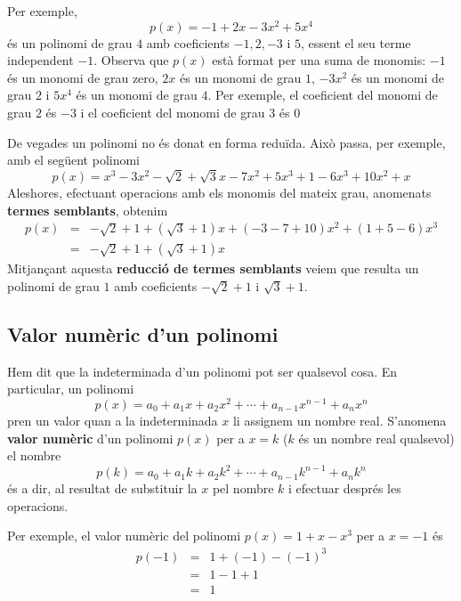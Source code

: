 Per exemple,\begin{equation*}
p(x)=-1+2x-3x^{2}+5x^{4}
\end{equation*}és un polinomi de grau $4$ amb coeficients $-1,2,-3$ i $5$, essent el seu terme independent $-1$. Observa que $p(x)$ està format per una
suma de monomis: $-1$ és un monomi de grau zero, $2x$ és un monomi de
grau $1$, $-3x^{2}$ és un monomi de grau $2$ i $5x^{4}$ és un monomi de
grau $4$. Per exemple, el coeficient del monomi de grau $2$ és $-3$ i el coeficient
del monomi de grau $3$ és $0$

De vegades un polinomi no és donat en forma reduïda. Això passa, per
exemple, amb el següent polinomi\begin{equation*}
p(x)=x^{3}-3x^{2}-\sqrt{2}+\sqrt{3}x-7x^{2}+5x^{3}+1-6x^{3}+10x^{2}+x
\end{equation*}Aleshores, efectuant operacions amb els monomis del mateix grau,
anomenats \textbf{termes semblants}, obtenim\begin{eqnarray*}
p(x) &=&-\sqrt{2}+1+(\sqrt{3}+1)x+(-3-7+10)x^{2}+(1+5-6)x^{3} \\
&=&-\sqrt{2}+1+(\sqrt{3}+1)x
\end{eqnarray*}Mitjançant aquesta \textbf{reducció de termes semblants} veiem que
resulta un polinomi de grau $1$ amb coeficients $-\sqrt{2}+1$ i $\sqrt{3}+1$.

\subsection{Valor numèric d'un polinomi}

Hem dit que la indeterminada d'un polinomi pot ser qualsevol cosa.
En particular, un polinomi\begin{equation*}
p(x)=a_{0}+a_{1}x+a_{2}x^{2}+\cdots +a_{n-1}x^{n-1}+a_{n}x^{n}
\end{equation*}pren un valor quan a la indeterminada $x$ li assignem un nombre real.
S'anomena \textbf{valor numèric} d'un polinomi $p(x)$ per a $x=k$ ($k$
és un nombre real qualsevol) el nombre\begin{equation*}
p(k)=a_{0}+a_{1}k+a_{2}k^{2}+\cdots +a_{n-1}k^{n-1}+a_{n}k^{n}
\end{equation*}és a dir, al resultat de substituir la $x$ pel nombre $k$ i efectuar
després les operacions.

Per exemple, el valor numèric del polinomi $p(x)=1+x-x^{3}$ per a $x=-1$
és\begin{eqnarray*}
p(-1) &=&1+(-1)-(-1)^{3} \\
&=&1-1+1 \\
&=&1
\end{eqnarray*}

